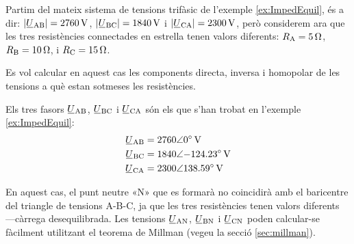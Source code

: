 \begin{exemple}\label{ex:ImpedDesequil}
	\addcontentsxms{\ImpedDesequil}
    Partim del mateix sistema de tensions trifàsic de l'exemple \vref{ex:ImpedEquil}, és a dir: $|\cmplx{U}\ped{AB}| =  \qty{2760}{V}$, $|\cmplx{U}\ped{BC}| = \qty{1840}{V}$ i
    $|\cmplx{U}\ped{CA}| = \qty{2300}{V}$, però considerem ara que les tres resistències connectades en estrella tenen valors diferents:  $R_\mathrm{A}=\qty{5}{\ohm}$, $R_\mathrm{B}=\qty{10}{\ohm}$,  i $R_\mathrm{C}=\qty{15}{\ohm}$.

    \begin{center}
        
    \end{center}

    Es vol calcular en aquest cas  les components directa, inversa i homopolar de les tensions a què estan sotmeses les resistències.

    Els tres fasors $\cmplx{U}\ped{AB} $, $\cmplx{U}\ped{BC} $ i $\cmplx{U}\ped{CA}$ són els que s'han trobat en l'exemple \ref{ex:ImpedEquil}:
    \begin{align*}
        \cmplx{U}\ped{AB} &= \complexqty{2760:0}{V} \\
        \cmplx{U}\ped{BC} &= \complexqty{1840:-124,23}{V} \\
        \cmplx{U}\ped{CA} &= \complexqty{2300:138,59}{V}
    \end{align*}

    En aquest cas, el punt neutre «N» que es formarà no coincidirà amb el baricentre del triangle de tensions A-B-C, ja que les tres resistències tenen valors diferents ---càrrega  desequilibrada. Les tensions $\cmplx{U}\ped{AN} $, $\cmplx{U}\ped{BN} $ i $\cmplx{U}\ped{CN}$ poden calcular-se fàcilment utilitzant el teorema de Millman (vegeu la secció \vref{sec:millman}).


\end{exemple}
